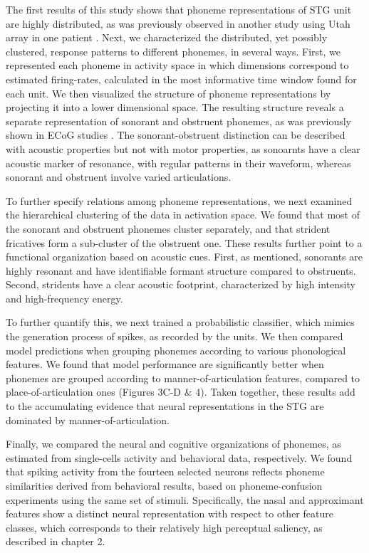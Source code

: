 The first results of this study shows that phoneme representations of STG unit are highly distributed, as was previously observed in another study using Utah array in one patient \cite{cash2015emergence}. Next, we characterized the distributed, yet possibly clustered, response patterns to different phonemes, in several ways. First, we represented each phoneme in activity space in which dimensions correspond to estimated firing-rates, calculated in the most informative time window found for each unit. We then visualized the structure of phoneme representations by projecting it into a lower dimensional space. The resulting structure reveals a separate representation of sonorant and obstruent phonemes, as was previously shown in ECoG studies \citep{Mesgarani2014}. The sonorant-obstruent distinction can be described with acoustic properties but not with motor properties, as sonoarnts have a clear acoustic marker of resonance, with regular patterns in their waveform, whereas sonorant and obstruent involve varied articulations.

To further specify relations among phoneme representations, we next examined the hierarchical clustering of the data in activation space. We found that most of the sonorant and obstruent phonemes cluster separately, and that strident fricatives form a sub-cluster of the obstruent one. These results further point to a functional organization based on acoustic cues. First, as mentioned, sonorants are highly resonant and have identifiable formant structure compared to obstruents. Second, stridents have a clear acoustic footprint, characterized by high intensity and high-frequency energy. 

To further quantify this, we next trained a probabilistic classifier, which mimics the generation process of spikes, as recorded by the units. We then compared model predictions when grouping phonemes according to various phonological features. We found that model performance are significantly better when phonemes are grouped according to manner-of-articulation features, compared to place-of-articulation ones (Figures 3C-D \& 4). Taken together, these results add to the accumulating evidence that neural representations in the STG are dominated by manner-of-articulation.

Finally, we compared the neural and cognitive organizations of phonemes, as estimated from single-cells activity and behavioral data, respectively. We found that spiking activity from the fourteen selected neurons reflects phoneme similarities derived from behavioral results, based on phoneme-confusion experiments using the same set of stimuli. Specifically, the nasal and approximant features show a distinct neural representation with respect to other feature classes, which corresponds to their relatively high perceptual saliency, as described in chapter 2.

